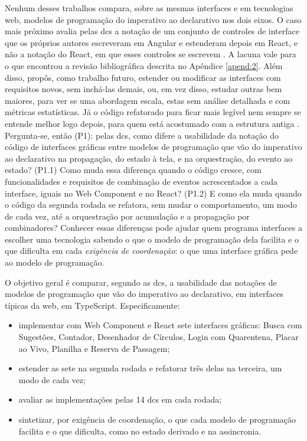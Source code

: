 Nenhum desses trabalhos compara, sobre as mesmas interfaces e em tecnologias
web, modelos de programação do imperativo ao declarativo nos dois eixos.
O caso mais próximo avalia pelas \glspl{dc} a notação de um conjunto de
controles de interface que os próprios autores escreveram em Angular e
estenderam depois em React, e não a notação do React, em que esses
controles se escrevem \cites{narechania2025}{verma2026}.
A lacuna vale para o que encontrou a revisão bibliográfica descrita no
Apêndice \ref{apend:2}.
Além disso, \textcite[p. 103-104]{kiss2014} propôs, como trabalho
futuro, estender ou modificar as interfaces com requisitos novos, sem
inchá-las demais, ou, em vez disso, estudar outras bem maiores, para ver
se uma abordagem escala, estas sem análise detalhada e com métricas
estatísticas.
Já o código refatorado para ficar mais legível nem sempre se entende
melhor logo depois,
para quem está acostumado com a estrutura antiga
\cite[p. 507]{ammerlaan2015}.
Pergunta-se, então (P1): pelas \glspl{dc}, como difere a usabilidade da
notação do código de interfaces gráficas entre modelos de programação
que vão do imperativo ao declarativo na propagação, do estado à tela, e
na orquestração, do evento ao estado?
(P1.1) Como muda essa diferença quando o código cresce, com
funcionalidades e requisitos de combinação de eventos acrescentados a
cada interface, iguais no Web Component e no React?
(P1.2) E como ela muda quando o código da segunda rodada se refatora,
sem mudar o comportamento, um modo de cada vez, até a orquestração por
acumulação e a propagação por combinadores?
Conhecer essas diferenças pode ajudar quem programa interfaces a escolher uma tecnologia
sabendo o que o modelo de programação dela facilita e o que dificulta em
cada \emph{exigência de coordenação}: o que uma interface gráfica pede ao modelo
de programação.

O objetivo geral é comparar, segundo as \glspl{dc}, a usabilidade das
notações de modelos de programação que vão do imperativo ao
declarativo, em interfaces típicas da web, em TypeScript.
Especificamente:

\begin{itemize}
\item implementar com Web Component e React sete interfaces gráficas:
Busca com Sugestões, Contador, Desenhador de Círculos, Login com
Quarentena, Placar ao Vivo, Planilha e Reserva de Passagem;
\item estender as sete na segunda rodada e refatorar três delas na
terceira, um modo de cada vez;
\item avaliar as implementações pelas 14 \glspl{dc} em cada rodada;
\item sintetizar, por exigência de coordenação, o que cada modelo de
programação facilita e o que dificulta, como no estado derivado e na
assincronia.
\end{itemize}

